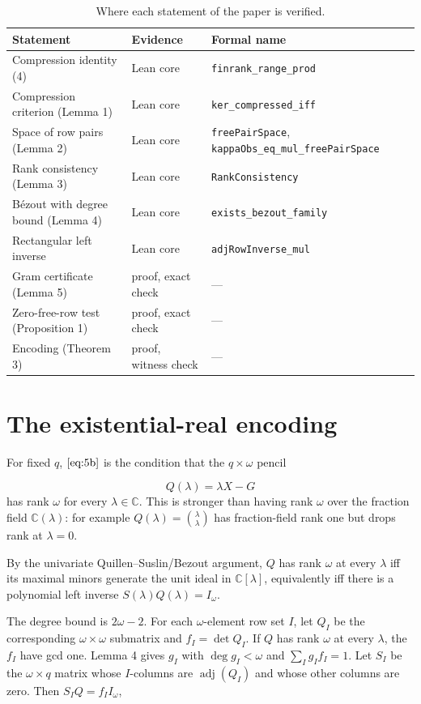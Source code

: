 \documentclass[journal]{IEEEtran}
\theoremstyle{plainn}
\theoremstyle{remark}
\begin{document}
\begin{table}[!t]
\centering
\caption{Where each statement of the paper is verified.}\label{tab:evidence}
\small
\begin{tabular}{@{}lll@{}}
\toprule
Statement & Evidence & Formal name \\
\midrule
Compression identity (4) & Lean core & \texttt{finrank\_range\_prod} \\
Compression criterion (Lemma 1) & Lean core & \texttt{ker\_compressed\_iff} \\
Space of row pairs (Lemma 2) & Lean core & \texttt{freePairSpace},
\texttt{kappaObs\_eq\_mul\_freePairSpace} \\
Rank consistency (Lemma 3) & Lean core & \texttt{RankConsistency} \\
B\'ezout with degree bound (Lemma 4) & Lean core & \texttt{exists\_bezout\_family} \\
Rectangular left inverse & Lean core & \texttt{adjRowInverse\_mul} \\
Gram certificate (Lemma 5) & proof, exact check & --- \\
Zero-free-row test (Proposition 1) & proof, exact check & --- \\
Encoding (Theorem 3) & proof, witness check & --- \\
\bottomrule
\end{tabular}
\end{table}

\appendices
\section{The existential-real encoding}\label{app:encoding}
For fixed $q$, $\eqref{eq:5b}$ is the condition that the $q\times\omega$ pencil

\begin{equation}
Q(\lambda)=\lambda X-G
\end{equation}
has rank $\omega$ for every $\lambda\in\mathbb C$. This is stronger than having rank $\omega$ over the fraction field $\mathbb C(\lambda)$: for example $Q(\lambda)=\binom{\lambda}{\lambda}$ has fraction-field rank one but drops rank at $\lambda=0$.

By the univariate Quillen--Suslin/Bezout argument, $Q$ has rank $\omega$ at every $\lambda$ iff its maximal minors generate the unit ideal in $\mathbb C[\lambda]$, equivalently iff there is a polynomial left inverse $S(\lambda)Q(\lambda)=I_\omega$.

The degree bound is $2\omega-2$. For each $\omega$-element row set $I$, let $Q_I$ be the corresponding $\omega\times\omega$ submatrix and $f_I=\det Q_I$. If $Q$ has rank $\omega$ at every $\lambda$, the $f_I$ have gcd one. Lemma 4 gives $g_I$ with $\deg g_I<\omega$ and $\sum_I g_I f_I=1$. Let $S_I$ be the $\omega\times q$ matrix whose $I$-columns are $\operatorname{adj}(Q_I)$ and whose other columns are zero. Then $S_I Q=f_I I_\omega$,
\end{document}
